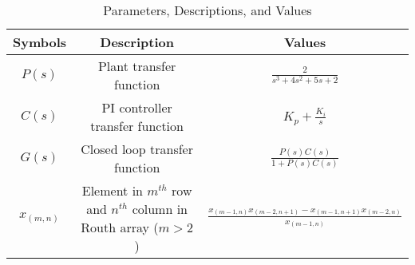 \begin{table}[ht!]
\centering
\begin{tabular}{ |c|c|c| } 
 \hline
Symbols & Description & Values  \\
\hline
$P(s)$ & Plant transfer function & $\frac{2}{s^3+4s^2+5s+2}$ \\
 \hline
 $C(s)$ & PI controller transfer function &$K_p+\frac{K_i}{s}$\\
 \hline
$G(s)$ & Closed loop transfer function &$\frac{P(s)C(s)}{1+P(s)C(s)}$\\
 \hline
 $x_{(m,n)}$ & Element in $m^{th}$ row and $n^{th}$ column in Routh array ($m > 2$)&$\frac{x_{(m-1,n)}x_{(m-2,n+1)}-x_{(m-1,n+1)}x_{(m-2,n)}}{x_{(m-1,n)}}$\\
 \hline
\end{tabular}
\caption{Parameters, Descriptions, and Values}
\label{table:ee25-ec48-gate2021}
\end{table}



